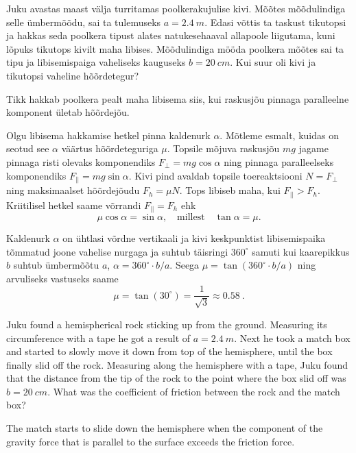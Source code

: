 
Juku avastas maast välja turritamas poolkerakujulise kivi. Mõõtes mõõdulindiga
selle ümbermõõdu, sai ta tulemuseks $a=\SI{2,4}{m}$. Edasi võttis ta taskust tikutopsi ja
hakkas seda poolkera tipust alates natukesehaaval allapoole liigutama, kuni
lõpuks tikutops kivilt maha libises. Mõõdulindiga mööda poolkera mõõtes sai ta
tipu ja libisemispaiga vaheliseks kauguseks $b=\SI{20}{cm}$. Kui suur oli kivi
ja tikutopsi vaheline hõõrdetegur?

\hint
Tikk hakkab poolkera pealt maha libisema siis, kui raskusjõu pinnaga paralleelne komponent ületab hõõrdejõu.

\solu
Olgu libisema hakkamise hetkel pinna kaldenurk $\alpha$. Mõtleme esmalt, kuidas on seotud see $\alpha$ väärtus hõõrdeteguriga $\mu$. Topsile mõjuva raskusjõu $mg$ jagame pinnaga risti olevaks komponendiks $F_{\bot}=mg\cos\alpha$ ning pinnaga paralleelseks komponendiks $F_{||}=mg\sin\alpha$. Kivi pind avaldab topsile toereaktsiooni $N=F_\bot$ ning maksimaalset hõõrdejõudu $F_h=\mu N$. Tops libiseb maha, kui $F_{||}>F_h$. Kriitilisel hetkel saame võrrandi $F_{||}=F_h$ ehk
\[ \mu \cos \alpha = \sin\alpha, \quad \text{millest} \quad \tan\alpha = \mu.\]

Kaldenurk $\alpha$ on ühtlasi võrdne vertikaali ja kivi keskpunktist libisemispaika tõmmatud joone vahelise nurgaga ja suhtub täisringi $360^\circ$ samuti kui kaarepikkus $b$ suhtub ümbermõõtu $a$, $\alpha = 360^\circ \!\cdot\! b/a$. Seega $\mu = \tan (360^\circ \! \cdot\! b/a)$ ning arvuliseks vastuseks saame 
\[\mu = \tan (30^\circ) = \frac{1}{\sqrt{3}} \approx \SI{0,58}{}.\]

Juku found a hemispherical rock sticking up from the ground. Measuring its circumference with a tape he got a result of $a=\SI{2,4}{m}$. Next he took a match box and started to slowly move it down from top of the hemisphere, until the box finally slid off the rock. Measuring along the hemisphere with a tape, Juku found that the distance from the tip of the rock to the point where the box slid off was $b=\SI{20}{cm}$. What was the coefficient of friction between the rock and the match box?

\hinteng
The match starts to slide down the hemisphere when the component of the gravity force that is parallel to the surface exceeds the friction force.

